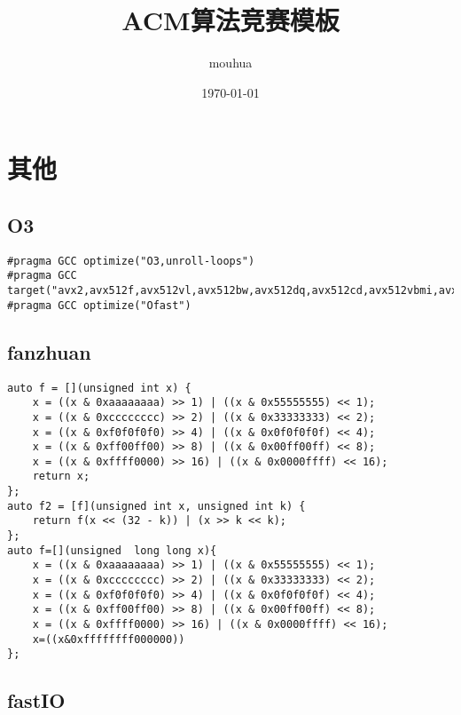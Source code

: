 \documentclass[a4paper,10pt]{article}
\title{ACM算法竞赛模板}
\author{mouhua}
\date{\today}
\begin{document}
\maketitle
\thispagestyle{fancy}
\newpage
\tableofcontents
\thispagestyle{fancy}
\newpage

\section{其他}
\thispagestyle{fancy}

\subsection{O3}
\thispagestyle{fancy}

\noindent\begin{lstlisting}
#pragma GCC optimize("O3,unroll-loops")
#pragma GCC target("avx2,avx512f,avx512vl,avx512bw,avx512dq,avx512cd,avx512vbmi,avx512vbmi2,avx512vpopcntdq,avx512bitalg,bmi,bmi2,lzcnt,popcnt")
#pragma GCC optimize("Ofast")\end{lstlisting}

\subsection{fanzhuan}
\thispagestyle{fancy}

\noindent\begin{lstlisting}
auto f = [](unsigned int x) {
    x = ((x & 0xaaaaaaaa) >> 1) | ((x & 0x55555555) << 1);
    x = ((x & 0xcccccccc) >> 2) | ((x & 0x33333333) << 2);
    x = ((x & 0xf0f0f0f0) >> 4) | ((x & 0x0f0f0f0f) << 4);
    x = ((x & 0xff00ff00) >> 8) | ((x & 0x00ff00ff) << 8);
    x = ((x & 0xffff0000) >> 16) | ((x & 0x0000ffff) << 16);
    return x;
};
auto f2 = [f](unsigned int x, unsigned int k) {
    return f(x << (32 - k)) | (x >> k << k);
};
auto f=[](unsigned  long long x){
    x = ((x & 0xaaaaaaaa) >> 1) | ((x & 0x55555555) << 1);
    x = ((x & 0xcccccccc) >> 2) | ((x & 0x33333333) << 2);
    x = ((x & 0xf0f0f0f0) >> 4) | ((x & 0x0f0f0f0f) << 4);
    x = ((x & 0xff00ff00) >> 8) | ((x & 0x00ff00ff) << 8);
    x = ((x & 0xffff0000) >> 16) | ((x & 0x0000ffff) << 16);
    x=((x&0xffffffff000000))
};\end{lstlisting}

\subsection{fastIO}
\thispagestyle{fancy}
\end{document}
